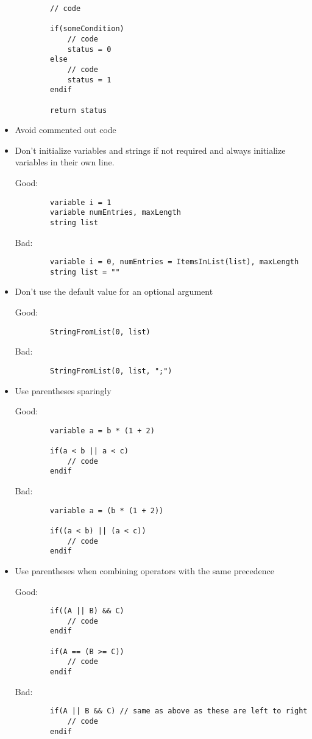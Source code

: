 \documentclass{scrartcl}
\begin{document}
\begin{itemize}
\begin{minipage}{\textwidth}
\begin{verbatim}
		// code

		if(someCondition)
			// code
			status = 0
		else
			// code
			status = 1
		endif

		return status
	\end{verbatim}
	\end{minipage}
%
	\item Avoid commented out code
%
	\item Don't initialize variables and strings if not required and always initialize variables in their own line.\par
	Good:
	\begin{verbatim}
		variable i = 1
		variable numEntries, maxLength
		string list
	\end{verbatim}
	Bad:
	\begin{verbatim}
		variable i = 0, numEntries = ItemsInList(list), maxLength
		string list = ""
	\end{verbatim}
%
	\item Don't use the default value for an optional argument\par
	Good:
	\begin{verbatim}
		StringFromList(0, list)
	\end{verbatim}
	Bad:
	\begin{verbatim}
		StringFromList(0, list, ";")
	\end{verbatim}
%
	\item Use parentheses sparingly\par
	Good:
	\begin{verbatim}
		variable a = b * (1 + 2)

		if(a < b || a < c)
			// code
		endif
	\end{verbatim}
	\begin{minipage}{\textwidth}
	Bad:
	\begin{verbatim}
		variable a = (b * (1 + 2))

		if((a < b) || (a < c))
			// code
		endif
	\end{verbatim}
	\end{minipage}
	\item Use parentheses when combining operators with the same precedence\par
	Good:
	\begin{verbatim}
		if((A || B) && C)
			// code
		endif

		if(A == (B >= C))
			// code
		endif
	\end{verbatim}
	Bad:
	\begin{verbatim}
		if(A || B && C) // same as above as these are left to right
			// code
		endif


\end{verbatim}
\end{itemize}
\end{document}

